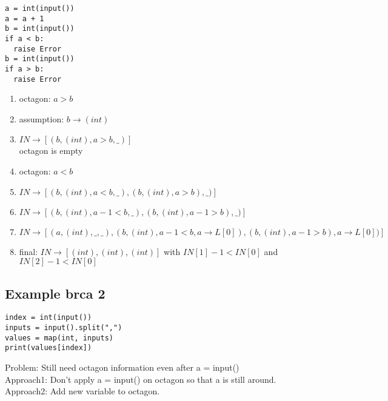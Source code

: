 \documentclass[11pt]{article}
\begin{document}
\begin{lstlisting}
a = int(input())
a = a + 1
b = int(input())
if a < b:
  raise Error
b = int(input())
if a > b:
  raise Error
\end{lstlisting}

\begin{enumerate}
  \item octagon: $a > b$
  \item assumption: $b \rightarrow (int)$
  \item $IN \rightarrow [(b, (int), a > b, \_)]$\\
  octagon is empty\\
  \item octagon: $a < b$
  \item $IN \rightarrow [(b, (int), a < b, \_), (b, (int), a > b), \_)]$
  \item $IN \rightarrow [(b, (int), a - 1 < b, \_), (b, (int), a - 1 > b), \_)]$
  \item $IN \rightarrow [(a, (int), \_, \_), (b, (int), a - 1 < b, a \rightarrow L[0]), (b, (int), a - 1 > b), a \rightarrow L[0])]$
  \item final: $IN \rightarrow [(int), (int), (int)]$ with $IN[1] - 1 < IN[0]$ and $IN[2] - 1 < IN[0]$
\end{enumerate}


\subsection{Example brca 2}
\begin{lstlisting}
index = int(input())
inputs = input().split(",")
values = map(int, inputs)
print(values[index])
\end{lstlisting}

Problem: Still need octagon information even after a = input()\\
Approach1: Don't apply a = input() on octagon so that a is still around.\\
Approach2: Add new variable to octagon.\\
\end{document}
